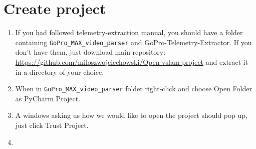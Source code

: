 \documentclass[a4paper,12pt]{book}
\begin{document}
\section{Create project}
\begin{enumerate}
	\item If you had followed telemetry-extraction manual, you should have a folder containing \verb|GoPro_MAX_video_parser| and GoPro-Telemetry-Extractor. If you don't have them, just download main repository: \url{https://github.com/miloszwojciechowski/Open-vslam-project} and extract it in a directory of your choice.
	\item \begin{minipage}[t]{\linewidth}
		\raggedright
		\medskip	
	\end{minipage}
	When in \verb|GoPro_MAX_video_parser| folder right-click and choose Open Folder as PyCharm Project.
	\item \begin{minipage}[t]{\linewidth}
		\raggedright
		\medskip	
	\end{minipage}
	A windows asking us how we would like to open the project should pop up, just click Trust Project.
	\item \begin{minipage}[t]{\linewidth}
		\raggedright
\end{minipage}
\end{enumerate}
\end{document}
